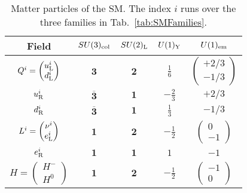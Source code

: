 \documentclass[12pt,a4paper]{book}
\begin{document}
\begin{small}
\renewcommand{\arraystretch}{1.6}
\begin{table}[h!]
\begin{center}
\begin{tabular}{ccccc}
\hline
Field & $SU(3)_{\rm col}$ & $SU(2)_{\rm L}$ & $U(1)_{\rm Y}$ & $U(1)_{\rm em}$\\
\hline
$Q^i = \begin{pmatrix} u^i_{\rm L} \\ d^i_{\rm L} \end{pmatrix}$ & $\mathbf{3}$ & $\mathbf{2}$ & $\frac{1}{6}$ & $\begin{pmatrix} +2/3 \\ -1/3 \end{pmatrix}$ \\
\hline
$u^i_{\rm R}$ & $\overline{\mathbf{3}}$ & $\mathbf{1}$ & $- \frac{2}{3}$ & $+2/3$ \\
\hline
$d^i_{\rm R}$ & $\overline{\mathbf{3}}$ & $\mathbf{1}$ & $\frac{1}{3}$ & $-1/3$ \\
\hline
$L^i = \left( \begin{matrix}\nu^i \\ e^i_{\rm L} \end{matrix}\right)$ & $\mathbf{1}$ & $\mathbf{2}$ & $- \frac{1}{2}$& $\begin{pmatrix} 0 \\ -1 \end{pmatrix}$ \\
\hline
$e^i_{\rm R}$ & $\mathbf{1}$ & $\mathbf{1}$ & $1$ & $-1$ \\
\hline
$H = \left( \begin{matrix} H^- \\ H^0 \end{matrix}\right)$ & $\mathbf{1}$ & $\mathbf{2}$ & $- \frac{1}{2}$ & $\begin{pmatrix} -1 \\ 0 \end{pmatrix}$\\
\hline
\end{tabular}
\end{center}
\caption{Matter particles of the SM. The index $i$ runs over the three families in Tab.~\ref{tab:SMFamilies}.}
\label{tab:SMMatter}
\end{table}
\end{small}
\end{document}

